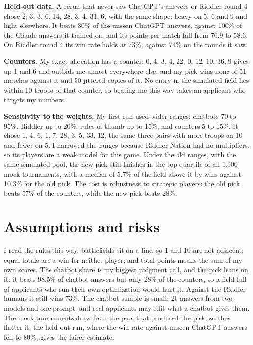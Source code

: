 \documentclass[10pt,a4paper,twocolumn]{article}
\begin{document}
\textbf{Held-out data.}
A rerun that never saw ChatGPT's answers or Riddler round 4 chose 2, 3, 3, 6, 14, 28, 3, 4, 31, 6, with the same shape: heavy on 5, 6 and 9 and light elsewhere.
It beats 80\% of the unseen ChatGPT answers, against 100\% of the Claude answers it trained on, and its points per match fall from 76.9 to 58.6.
On Riddler round 4 its win rate holds at 73\%, against 74\% on the rounds it saw.

\textbf{Counters.}
My exact allocation has a counter: 0, 4, 3, 4, 22, 0, 12, 10, 36, 9 gives up 1 and 6 and outbids me almost everywhere else, and my pick wins none of 51 matches against it and 50 jittered copies of it.
No entry in the simulated field lies within 10 troops of that counter, so beating me this way takes an applicant who targets my numbers.

\textbf{Sensitivity to the weights.}
My first run used wider ranges: chatbots 70 to 95\%, Riddler up to 20\%, rules of thumb up to 15\%, and counters 5 to 15\%.
It chose 1, 4, 6, 1, 7, 28, 3, 5, 33, 12, the same three pairs with more troops on 10 and fewer on 5.
I narrowed the ranges because Riddler Nation had no multipliers, so its players are a weak model for this game.
Under the old ranges, with the same simulated pool, the new pick still finishes in the top quartile of all 1,000 mock tournaments, with a median of 5.7\% of the field above it by wins against 10.3\% for the old pick.
The cost is robustness to strategic players: the old pick beats 57\% of the counters, while the new pick beats 28\%.

\section{Assumptions and risks}

I read the rules this way: battlefields sit on a line, so 1 and 10 are not adjacent; equal totals are a win for neither player; and total points means the sum of my own scores.
The chatbot share is my biggest judgment call, and the pick leans on it: it beats 98.5\% of chatbot answers but only 28\% of the counters, so a field full of applicants who run their own optimization would hurt it.
Against the Riddler humans it still wins 73\%.
The chatbot sample is small: 20 answers from two models and one prompt, and real applicants may edit what a chatbot gives them.
The mock tournaments draw from the pool that produced the pick, so they flatter it; the held-out run, where the win rate against unseen ChatGPT answers fell to 80\%, gives the fairer estimate.
\end{document}
